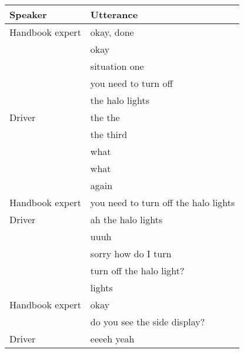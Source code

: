 \begin{table}[H]
\begin{tabular}{p{3cm}p{8cm}}
Speaker & Utterance \\
\hline
Handbook expert & okay, done                                                      \\
                    & okay                                                            \\
                    & situation one                                                   \\
                    & you need to turn off                                            \\
                    & the halo lights                                                 \\
Driver              & the the                                                         \\
                    & the third                                                       \\
                    & what                                                            \\
                    & what                                                            \\
                    & again                                                           \\
Handbook expert & you need to turn off the halo lights                            \\
Driver              & ah the halo lights                                              \\
                    & uuuh                                                            \\
                    & sorry how do I turn                                             \\
                    & turn off the halo light?                                        \\
                    & lights                                                          \\
Handbook expert & okay                                                            \\
                    & do you see the side display?                                    \\
Driver              & eeeeh yeah                                                      \\

\end{tabular}
\end{table}
